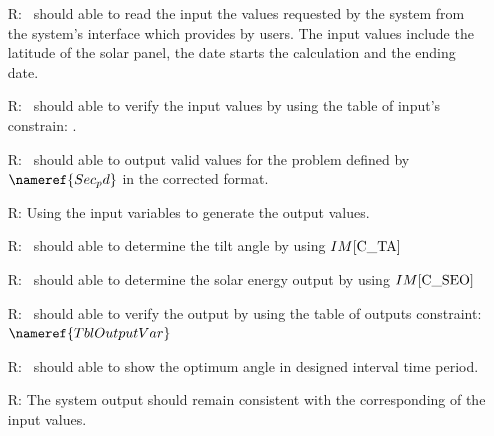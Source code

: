 \documentclass[12pt]{article}
\newcommand{\iref}[1]{IM\ref{#1}}
\newcounter{reqnum} %
\begin{document}
\noindent \begin{itemize}

\item[R\refstepcounter{reqnum}\thereqnum \label{R_Inputs}:] \progname~should able to read the input the values 
requested by the system from the
system's interface which provides by users. The input values include
the latitude of the solar panel, the date starts the calculation and the ending date.\\

\item[R\refstepcounter{reqnum}\thereqnum \label{R_InputsVery}:]\progname~should able to verify the input values by using the 
table of input's constrain: . \\


\item[R\refstepcounter{reqnum}\thereqnum \label{R_OutputInputs}:] \progname~should able to output valid values for the problem defined by $\nameref{Sec_pd} $ in the corrected format.\\


\item[R\refstepcounter{reqnum}\thereqnum \label{R_VerifyOutput}:] Using the input variables to generate the output values.\\


\item[R\refstepcounter{reqnum}\thereqnum \label{R_CalculateAngle}:] \progname~should able to determine the tilt angle by using $\iref{C_TA}$\\

\item[R\refstepcounter{reqnum}\thereqnum \label{R_CalculateEnergy}:] \progname~should able to determine the solar energy output by 
using $\iref{C_SEO}$\\


\item[R\refstepcounter{reqnum}\thereqnum \label{R_OutputConstraint}:] \progname~should able to verify the output by using the table of outputs constraint: $\nameref{TblOutputVar}$\\



\item[R\refstepcounter{reqnum}\thereqnum \label{R_Outputshowt}:] \progname~should able to show the optimum angle in designed interval time period.\\

\item[R\refstepcounter{reqnum}\thereqnum \label{R_Outputconsist}:]
The system output should remain consistent with
the corresponding of the input values.


\end{itemize}
\end{document}
